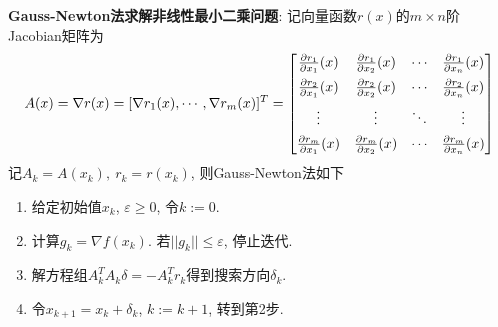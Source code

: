 \documentclass[12pt, a4paper, oneside]{ctexart}
\let\leq=\leqslant %
\let\geq=\geqslant %
\def\add{\vspace{1ex}}      %
\begin{document}
\textbf{Gauss-Newton法求解非线性最小二乘问题}: 记向量函数$r(x)$的$m\times n$阶Jacobian矩阵为
\begin{equation*}
    A(x) = \nabla r(x) = [\nabla r_1(x),\cdots,\nabla r_m(x)]^T = \left[\begin{matrix}
        \frac{\partial r_1}{\partial x_1}(x) & \frac{\partial r_1}{\partial x_2}(x) & \cdots & \frac{\partial r_1}{\partial x_n}(x) \add\\
        \frac{\partial r_2}{\partial x_1}(x) & \frac{\partial r_2}{\partial x_2}(x) & \cdots & \frac{\partial r_2}{\partial x_n}(x) \add\\
        \vdots&\vdots&\ddots&\vdots\add\\
        \frac{\partial r_m}{\partial x_1}(x) & \frac{\partial r_m}{\partial x_2}(x) & \cdots & \frac{\partial r_m}{\partial x_n}(x)
    \end{matrix}\right]
\end{equation*}
记$A_k = A(x_k),\ r_k = r(x_k)$, 则Gauss-Newton法如下
\begin{enumerate}
    \item 给定初始值$x_k$, $\varepsilon\geq 0$, 令$k:=0$.
    \item 计算$g_k = \nabla f(x_k)$. 若$||g_k||\leq \varepsilon$, 停止迭代.
    \item 解方程组$A_k^TA_k\delta = -A_k^Tr_k$得到搜索方向$\delta_k$.
    \item 令$x_{k+1} = x_k + \delta_k$, $k:=k+1$, 转到第2步.
\end{enumerate}
\end{document}
